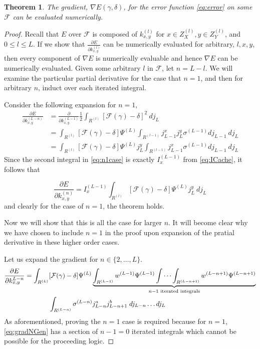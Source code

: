 \documentclass[titlepage, twoside]{article}
\numberwithin{equation}{subsection}
\newtheorem{theorem}{Theorem}
\numberwithin{theorem}{subsection}
\begin{document}
\begin{theorem}
The gradient, $\nabla E(\gamma,\delta)$, for the error function \eqref{eq:error} on some $\mathcal{F}$ can be evaluated numerically.
\end{theorem}

\begin{proof}
  Recall that $E$ over $\mathcal{F}$ is composed of $k^{(l)}_{x,y}$ for $x \in Z^{(l)}_X, y \in Z^{(l)}_Y$, and $0\leq l \leq L$.
  If we show that $\frac{\partial E}{\partial k^{(l)}_{x,y}}$ can be numerically evaluated for arbitrary, $l,x,y$, then every component of $\nabla E$ is numerically evaluable and hence $\nabla E$ can be numerically evaluated.
  Given some arbitrary $l$ in $\mathcal{F}$, let $n = L - l$.
  We will examine the particular partial derivative for the case that $n = 1$, and then for arbitrary $n$, induct over each iterated integral.

  Consider the following expansion for $n = 1$,
  \begin{align}
  \frac{\partial E}{\partial k^{(L-n)}_{x,y}} &= 
    \frac{\partial}{\partial k^{(L-1)}_{x,y}} 
    \frac{1}{2} \int_{R^{(l)}} \left[\mathcal{F}(\gamma) - \delta\right]^2\ dj_L \nonumber \\
  &= \int_{R^{(l)}} \left[\mathcal{F}(\gamma) - \delta\right] \Psi^{(L)} 
    \int_{R^{(l-1)}} j_{L-1}^x j_{L}^y \sigma^{(L-1)} dj_{L-1}\ dj_L \nonumber \\
  &= \int_{R^{(l)}} \left[\mathcal{F}(\gamma) - \delta\right] \Psi^{(L)} j_{L}^y 
    \int_{R^{(l-1)}} j_{L-1}^x \sigma^{(L-1)} dj_{L-1}\ dj_L \label{eq:n1case}
  \end{align}
  Since the second integral in \eqref{eq:n1case} is exactly $I^{(L-1)}_x$ from    \eqref{eq:ICache}, it follows that 
  
  \begin{equation}
  \frac{\partial E}{\partial k^{(n)}_{x,y}} = I^{(L-1)}_x
    \int_{R^{(l)}} \left[\mathcal{F}(\gamma) - \delta\right] \Psi^{(L)} j_{L}^y  \ dj_L
  \end{equation}
  and clearly for the case of $n=1$, the theorem holds. 

  Now we will show that this is all the case for larger $n$. 
  It will become clear why we have chosen to include $n=1$ in the proof upon expansion of the pratial derivative in these higher order cases.

  Let us expand the gradient for $n\in \{2,\dots,L\}$.
  \begin{equation} \label{eq:gradNGen}
  \begin{aligned} 
  \frac{\partial  E}{\partial k^{L-n}_{x,y}} = 
  \int_{R^{(L)}}  &[\mathcal{F}(\gamma)-\delta] \Psi^{(L)} 
   \underbrace{\int_{R^{(L-1)}} w^{(L-1)} \Psi^{(L-1)} 
  \idotsint_{R^{(L-n+1)}} w^{(L-n+1)} \Psi^{(L-n+1)}}_{n-1\text{ iterated integrals}} \\ 
    &\int_{R^{(L-n)}} \sigma^{(L-n)} j^{a}_{L-n}j^{b}_{L-n+1}\; dj_{L-n}\dots dj_L
  \end{aligned}
  \end{equation}
  As aforementioned, proving the $n=1$ case is required because for $n=1$, \eqref{eq:gradNGen} has a section of $n-1 = 0$ iterated integrals which cannot be possible for the proceeding logic.


\end{proof}
\end{document}
